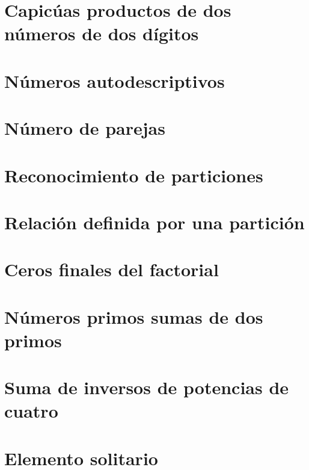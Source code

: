 \documentclass[a4paper,12pt,twoside]{book}
\begin{document}
\chapter{Capicúas productos de dos números de dos dígitos}

 
\chapter{Números autodescriptivos}

\chapter{Número de parejas}

\chapter{Reconocimiento de particiones}

\chapter{Relación definida por una partición}

\chapter{Ceros finales del factorial}

 
\chapter{Números primos sumas de dos primos}

\chapter{Suma de inversos de potencias de cuatro}

\chapter{Elemento solitario}
\end{document}
